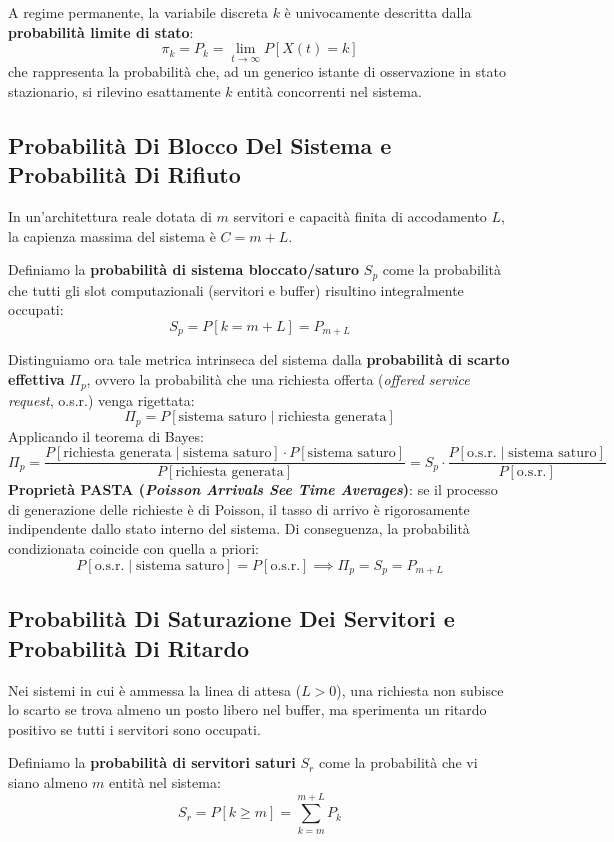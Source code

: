 \documentclass[11pt, a4paper]{article}
\begin{document}
A regime permanente, la variabile discreta $k$ è univocamente descritta dalla \textbf{probabilità limite di stato}:
\[
    \pi_k = P_k = \lim_{t \to \infty} P[X(t) = k]
\]
che rappresenta la probabilità che, ad un generico istante di osservazione in stato stazionario, si rilevino esattamente $k$ entità concorrenti nel sistema.

\subsection{Probabilità Di Blocco Del Sistema e Probabilità Di Rifiuto}

In un'architettura reale dotata di $m$ servitori e capacità finita di accodamento $L$, la capienza massima del sistema è $C = m + L$.

Definiamo la \textbf{probabilità di sistema bloccato/saturo} $S_p$ come la probabilità che tutti gli slot computazionali (servitori e buffer) risultino integralmente occupati:
\[
    \boxed{S_p = P[k = m + L] = P_{m+L}}
\]

Distinguiamo ora tale metrica intrinseca del sistema dalla \textbf{probabilità di scarto effettiva} $\Pi_p$, ovvero la probabilità che una richiesta offerta (\emph{offered service request}, o.s.r.) venga rigettata:
\[
    \Pi_p = P[\text{sistema saturo} \mid \text{richiesta generata}]
\]
Applicando il teorema di Bayes:
\[
    \Pi_p = \frac{P[\text{richiesta generata} \mid \text{sistema saturo}] \cdot P[\text{sistema saturo}]}{P[\text{richiesta generata}]} = S_p \cdot \frac{P[\text{o.s.r.} \mid \text{sistema saturo}]}{P[\text{o.s.r.}]}
\]
\textbf{Proprietà PASTA (\emph{Poisson Arrivals See Time Averages})}: se il processo di generazione delle richieste è di Poisson, il tasso di arrivo è rigorosamente indipendente dallo stato interno del sistema. Di conseguenza, la probabilità condizionata coincide con quella a priori:
\[
    P[\text{o.s.r.} \mid \text{sistema saturo}] = P[\text{o.s.r.}] \implies \boxed{\Pi_p = S_p = P_{m+L}}
\]

\subsection{Probabilità Di Saturazione Dei Servitori e Probabilità Di Ritardo}

Nei sistemi in cui è ammessa la linea di attesa ($L > 0$), una richiesta non subisce lo scarto se trova almeno un posto libero nel buffer, ma sperimenta un ritardo positivo se tutti i servitori sono occupati.

Definiamo la \textbf{probabilità di servitori saturi} $S_r$ come la probabilità che vi siano almeno $m$ entità nel sistema:
\[
    \boxed{S_r = P[k \ge m] = \sum_{k=m}^{m+L} P_k}
\]
\end{document}
